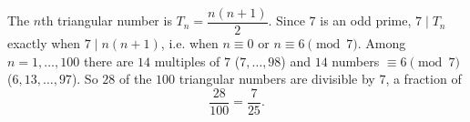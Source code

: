 The $n$th triangular number is $T_n=\dfrac{n(n+1)}{2}$. Since $7$ is an odd prime, $7\mid T_n$ exactly when $7\mid n(n+1)$, i.e. when $n\equiv0$ or $n\equiv6\pmod7$. Among $n=1,\dots,100$ there are $14$ multiples of $7$ ($7,\dots,98$) and $14$ numbers $\equiv6\pmod7$ ($6,13,\dots,97$). So $28$ of the $100$ triangular numbers are divisible by $7$, a fraction of
\[\dfrac{28}{100}=\boxed{\dfrac{7}{25}}.\]

